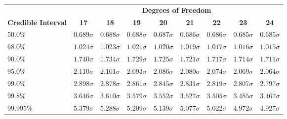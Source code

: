 \begin{center}
\begin{tabular}{p{0.75in}cccccccc}
 & \multicolumn{8}{c}{\bf Degrees of Freedom} \\
{\bf Credible Interval} & {\bf 17} & {\bf 18} & {\bf 19} & {\bf 20} & {\bf 21} & {\bf 22} & {\bf 23} & {\bf 24}\\
50.0\%& $ 0.689 \sigma$& $ 0.688 \sigma$& $ 0.688 \sigma$& $ 0.687 \sigma$& $ 0.686 \sigma$& $ 0.686 \sigma$& $ 0.685 \sigma$& $ 0.685 \sigma$\\
68.0\%& $ 1.024 \sigma$& $ 1.023 \sigma$& $ 1.021 \sigma$& $ 1.020 \sigma$& $ 1.019 \sigma$& $ 1.017 \sigma$& $ 1.016 \sigma$& $ 1.015 \sigma$\\
90.0\%& $ 1.740 \sigma$& $ 1.734 \sigma$& $ 1.729 \sigma$& $ 1.725 \sigma$& $ 1.721 \sigma$& $ 1.717 \sigma$& $ 1.714 \sigma$& $ 1.711 \sigma$\\
95.0\%& $ 2.110 \sigma$& $ 2.101 \sigma$& $ 2.093 \sigma$& $ 2.086 \sigma$& $ 2.080 \sigma$& $ 2.074 \sigma$& $ 2.069 \sigma$& $ 2.064 \sigma$\\
99.0\%& $ 2.898 \sigma$& $ 2.878 \sigma$& $ 2.861 \sigma$& $ 2.845 \sigma$& $ 2.831 \sigma$& $ 2.819 \sigma$& $ 2.807 \sigma$& $ 2.797 \sigma$\\
99.8\%& $ 3.646 \sigma$& $ 3.610 \sigma$& $ 3.579 \sigma$& $ 3.552 \sigma$& $ 3.527 \sigma$& $ 3.505 \sigma$& $ 3.485 \sigma$& $ 3.467 \sigma$\\
99.995\%& $ 5.379 \sigma$& $ 5.288 \sigma$& $ 5.209 \sigma$& $ 5.139 \sigma$& $ 5.077 \sigma$& $ 5.022 \sigma$& $ 4.972 \sigma$& $ 4.927 \sigma$\\
\end{tabular}
\end{center}
